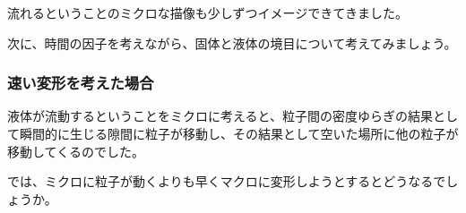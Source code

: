 \documentclass[uplatex,dvipdfmx,a4paper,11pt]{jsarticle}
\begin{document}
流れるということのミクロな描像も少しずつイメージできてきました。

次に、時間の因子を考えながら、固体と液体の境目について考えてみましょう。

\subsubsection{速い変形を考えた場合}

液体が流動するということをミクロに考えると、粒子間の密度ゆらぎの結果として瞬間的に生じる隙間に粒子が移動し、その結果として空いた場所に他の粒子が移動してくるのでした。

では、ミクロに粒子が動くよりも早くマクロに変形しようとするとどうなるでしょうか。
\end{document}
